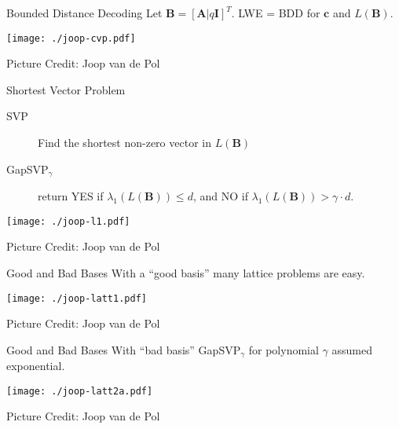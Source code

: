 \documentclass[presentation,smaller]{beamer}
\renewcommand{\vec}[1]{\ensuremath{\mathbf{#1}}\xspace}
\begin{document}
\begin{frame}[label={sec:org672584c}]{Bounded Distance Decoding}
Let \(\vec{B} = [\vec{A} | q\vec{I}]^T\). LWE = BDD for \(\vec{c}\) and \(L(\vec{B})\).

\begin{center}
\texttt{[image: ./joop-cvp.pdf]}
\end{center}

\tiny Picture Credit: Joop van de Pol
\end{frame}


\begin{frame}[label={sec:org00d448d}]{Shortest Vector Problem}
\begin{description}
\item[{SVP}] Find the shortest non-zero vector in \(L(\vec{B})\)
\item[{GapSVP\(_γ\)}] return YES if \(λ_1(L(\vec{B})) ≤ d\), and NO if \(λ_1(L(\vec{B})) > γ⋅d\).
\end{description}

\begin{center}
\begin{center}
\texttt{[image: ./joop-l1.pdf]}
\end{center}
\end{center}

\tiny Picture Credit: Joop van de Pol
\end{frame}

\begin{frame}[label={sec:org27e262e}]{Good and Bad Bases}
With a “good basis” many lattice problems are easy.

\begin{center}
\begin{center}
\texttt{[image: ./joop-latt1.pdf]}
\end{center}
\end{center}

\tiny Picture Credit: Joop van de Pol
\end{frame}


\begin{frame}[label={sec:org59a9dc6}]{Good and Bad Bases}
With “bad basis” GapSVP\(_γ\) for polynomial \(γ\) assumed exponential.

\begin{center}
\begin{center}
\texttt{[image: ./joop-latt2a.pdf]}
\end{center}
\end{center}

\tiny Picture Credit: Joop van de Pol
\end{frame}
\end{document}
